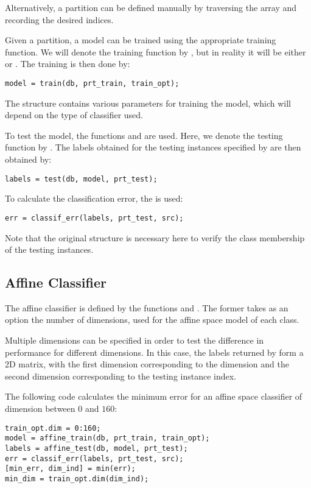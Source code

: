 \documentclass[twocolumn]{article}
\begin{document}
Alternatively, a partition can be defined manually by traversing the  array and recording the desired indices.

Given a partition, a model can be trained using the appropriate training function. We will denote the training function by , but in reality it will be either  or . The training is then done by:
\begin{lstlisting}
model = train(db, prt_train, train_opt);
\end{lstlisting}
The structure  contains various parameters for training the model, which will depend on the type of classifier used.

To test the model, the functions  and  are used. Here, we denote the testing function by . The labels obtained for the testing instances specified by  are then obtained by:
\begin{lstlisting}
labels = test(db, model, prt_test);
\end{lstlisting}
To calculate the classification error, the  is used:
\begin{lstlisting}
err = classif_err(labels, prt_test, src);
\end{lstlisting}
Note that the original  structure is necessary here to verify the class membership of the testing instances.

\subsection{Affine Classifier}

The affine classifier is defined by the functions  and . The former takes as an option the number of dimensions,  used for the affine space model of each class. 

Multiple dimensions can be specified in order to test the difference in performance for different dimensions. In this case, the labels returned by  form a 2D matrix, with the first dimension corresponding to the dimension and the second dimension corresponding to the testing instance index.

The following code calculates the minimum error for an affine space classifier of dimension between $0$ and $160$:
\begin{lstlisting}
train_opt.dim = 0:160;
model = affine_train(db, prt_train, train_opt);
labels = affine_test(db, model, prt_test);
err = classif_err(labels, prt_test, src);
[min_err, dim_ind] = min(err);
min_dim = train_opt.dim(dim_ind);
\end{lstlisting}
\end{document}
